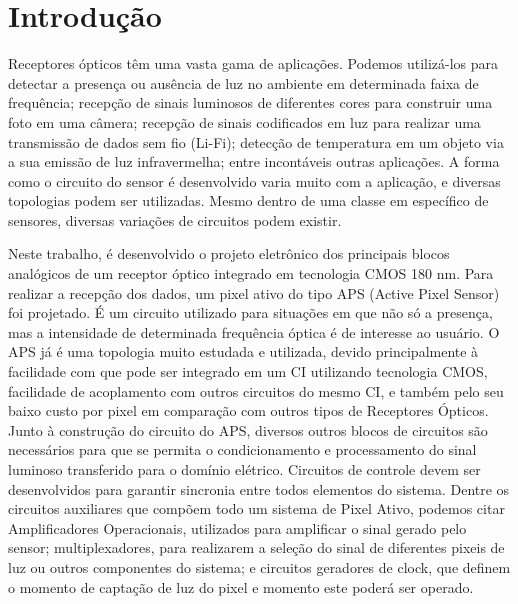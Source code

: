 \chapter[Introdução]{Introdução}
Receptores ópticos têm uma vasta gama de aplicações. Podemos utilizá-los para detectar a presença ou ausência de luz no ambiente em determinada faixa de frequência; recepção de sinais luminosos de diferentes cores para construir uma foto em uma câmera; recepção de sinais codificados em luz para realizar uma transmissão de dados sem fio (Li-Fi); detecção de temperatura em um objeto via a sua emissão de luz infravermelha; entre incontáveis outras aplicações. A forma como o circuito do sensor é desenvolvido varia muito com a aplicação, e diversas topologias podem ser utilizadas. Mesmo dentro de uma classe em específico de sensores, diversas variações de circuitos podem existir.

Neste trabalho, é desenvolvido o projeto eletrônico dos principais blocos analógicos de um receptor óptico integrado em tecnologia CMOS 180 nm. Para realizar a recepção dos dados, um pixel ativo do tipo APS (Active Pixel Sensor) foi projetado. É um circuito utilizado para situações em que não só a presença, mas a intensidade de determinada frequência óptica é de interesse ao usuário. O APS já é uma topologia muito estudada e utilizada, devido principalmente à facilidade com que pode ser integrado em um CI utilizando tecnologia CMOS, facilidade de acoplamento com outros circuitos do mesmo CI, e também pelo seu baixo custo por pixel em comparação com outros tipos de Receptores Ópticos. 
Junto à construção do circuito do APS, diversos outros blocos de circuitos são necessários para que se permita o condicionamento e processamento do sinal luminoso transferido para o domínio elétrico. Circuitos de controle devem ser desenvolvidos para garantir sincronia entre todos elementos do sistema. Dentre os circuitos auxiliares que compõem todo um sistema de Pixel Ativo, podemos citar Amplificadores Operacionais, utilizados para amplificar o sinal gerado pelo sensor; multiplexadores, para realizarem a seleção do sinal de diferentes pixeis de luz ou outros componentes do sistema; e circuitos geradores de clock, que definem o momento de captação de luz do pixel e momento este poderá ser operado.

